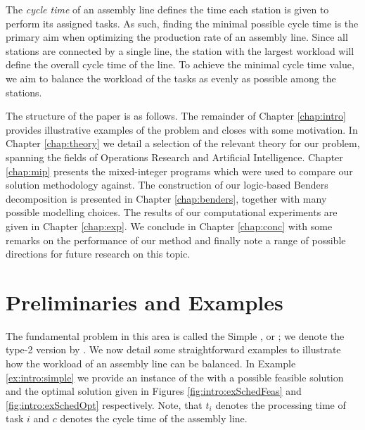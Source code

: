 The \emph{cycle time} of an assembly line defines the time each station
is given to perform its assigned tasks.
As such, finding the minimal possible cycle time 
is the primary aim when optimizing the production
rate of an assembly line.
Since all stations are connected by a single line,
the station with the largest workload will define the
overall cycle time of the line.
To achieve the minimal cycle time value,
we aim to balance the workload of the tasks
as evenly as possible among the stations.

The structure of the paper is as follows.
The remainder of Chapter \ref{chap:intro}
provides illustrative examples of the problem
and closes with some motivation.
In Chapter \ref{chap:theory} we detail a selection
of the relevant theory for our problem, spanning
the fields of Operations Research and Artificial Intelligence.
Chapter \ref{chap:mip} presents the mixed-integer
programs which were used to compare our
solution methodology against.
The construction of our logic-based Benders
decomposition is presented in Chapter \ref{chap:benders},
together with many possible modelling choices.
The results of our computational experiments are 
given in Chapter \ref{chap:exp}.
We conclude in Chapter \ref{chap:conc}
with some remarks on the performance of our
method and finally note a range of possible directions
for future research on this topic.

\section{Preliminaries and Examples}
\label{sec:intro:prelim}
The fundamental problem in this area is called the
Simple \albp{}, or \sab{}; we denote
the type-2 version by .
We now detail some straightforward examples
to illustrate how the workload
of an assembly line can be balanced.
In Example \ref{ex:intro:simple} we provide an instance
of the  with a possible feasible solution and the optimal solution given
in Figures \ref{fig:intro:exSchedFeas} and \ref{fig:intro:exSchedOpt}
respectively. Note, that $t_i$ denotes the processing time of task $i$ and
$c$ denotes the cycle time of the assembly line.

